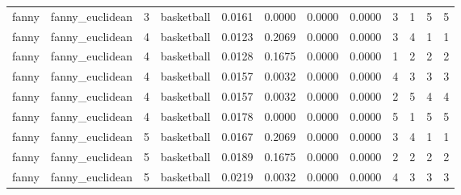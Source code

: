{\begin{longtable}{| p{1cm} | p{1.8cm} | p{0.7cm} | p{0.9cm} | p{0.5cm} | p{0.65cm} | p{0.5cm} | p{0.5cm} | p{0.55cm} | p{0.55cm} | p{0.6cm} | p{0.5cm} |}
\scriptsize   fanny   & \scriptsize  fanny\_euclidean & \scriptsize    3    & \scriptsize basketball & \scriptsize    0.0161  &  \scriptsize 0.0000 & \scriptsize 0.0000 & \scriptsize    0.0000 & \scriptsize   3  & \scriptsize    1  & \scriptsize    5  & \scriptsize    5 \\
\cline{3-12}
\scriptsize   fanny   & \scriptsize  fanny\_euclidean & \scriptsize    4    & \scriptsize basketball & \scriptsize    0.0123  &  \scriptsize 0.2069 & \scriptsize 0.0000 & \scriptsize    0.0000 & \scriptsize   3  & \scriptsize    4  & \scriptsize    1  & \scriptsize    1 \\
\scriptsize   fanny   & \scriptsize  fanny\_euclidean & \scriptsize    4    & \scriptsize basketball & \scriptsize    0.0128  &  \scriptsize 0.1675 & \scriptsize 0.0000 & \scriptsize    0.0000 & \scriptsize   1  & \scriptsize    2  & \scriptsize    2  & \scriptsize    2 \\
\scriptsize   fanny   & \scriptsize  fanny\_euclidean & \scriptsize    4    & \scriptsize basketball & \scriptsize    0.0157  &  \scriptsize 0.0032 & \scriptsize 0.0000 & \scriptsize    0.0000 & \scriptsize   4  & \scriptsize    3  & \scriptsize    3  & \scriptsize    3 \\
\scriptsize   fanny   & \scriptsize  fanny\_euclidean & \scriptsize    4    & \scriptsize basketball & \scriptsize    0.0157  &  \scriptsize 0.0032 & \scriptsize 0.0000 & \scriptsize    0.0000 & \scriptsize   2  & \scriptsize    5  & \scriptsize    4  & \scriptsize    4 \\
\scriptsize   fanny   & \scriptsize  fanny\_euclidean & \scriptsize    4    & \scriptsize basketball & \scriptsize    0.0178  &  \scriptsize 0.0000 & \scriptsize 0.0000 & \scriptsize    0.0000 & \scriptsize   5  & \scriptsize    1  & \scriptsize    5  & \scriptsize    5 \\
\cline{3-12}
\scriptsize   fanny   & \scriptsize  fanny\_euclidean & \scriptsize    5    & \scriptsize basketball & \scriptsize    0.0167  &  \scriptsize 0.2069 & \scriptsize 0.0000 & \scriptsize    0.0000 & \scriptsize   3  & \scriptsize    4  & \scriptsize    1  & \scriptsize    1 \\
\scriptsize   fanny   & \scriptsize  fanny\_euclidean & \scriptsize    5    & \scriptsize basketball & \scriptsize    0.0189  &  \scriptsize 0.1675 & \scriptsize 0.0000 & \scriptsize    0.0000 & \scriptsize   2  & \scriptsize    2  & \scriptsize    2  & \scriptsize    2 \\
\scriptsize   fanny   & \scriptsize  fanny\_euclidean & \scriptsize    5    & \scriptsize basketball & \scriptsize    0.0219  &  \scriptsize 0.0032 & \scriptsize 0.0000 & \scriptsize    0.0000 & \scriptsize   4  & \scriptsize    3  & \scriptsize    3  & \scriptsize    3 \\

\end{longtable}}
